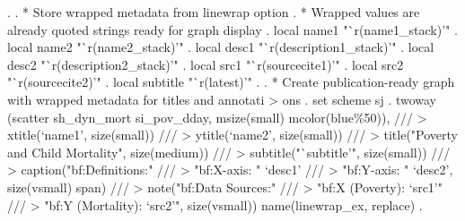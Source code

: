 . 
. * Store wrapped metadata from linewrap option
. * Wrapped values are already quoted strings ready for graph display
. local name1 "`r(name1_stack)'"
{\smallskip}
. local name2 "`r(name2_stack)'"
{\smallskip}
. local desc1 "`r(description1_stack)'"
{\smallskip}
. local desc2 "`r(description2_stack)'"
{\smallskip}
. local src1 "`r(sourcecite1)'"
{\smallskip}
. local src2 "`r(sourcecite2)'"
{\smallskip}
. local subtitle "`r(latest)'"
{\smallskip}
. 
. * Create publication-ready graph with wrapped metadata for titles and annotati
> ons
. set scheme sj
{\smallskip}
. twoway (scatter sh_dyn_mort si_pov_dday, msize(small) mcolor(blue\%50)), ///
>     xtitle(`name1', size(small)) ///
>     ytitle(`name2', size(small)) ///
>     title("Poverty and Child Mortality", size(medium)) ///
>     subtitle("`subtitle'", size(small)) ///
>     caption("{\lbr}bf:Definitions:{\rbr}" ///
>             "{\lbr}bf:X-axis:{\rbr} " `desc1' ///
>             "{\lbr}bf:Y-axis:{\rbr} " `desc2', size(vsmall) span) ///
>     note("{\lbr}bf:Data Sources:{\rbr}" ///
>         "{\lbr}bf:X (Poverty):{\rbr} `src1'" ///
>         "{\lbr}bf:Y (Mortality):{\rbr} `src2'", size(vsmall)) name(linewrap_ex, replace)
{\smallskip}
. 
